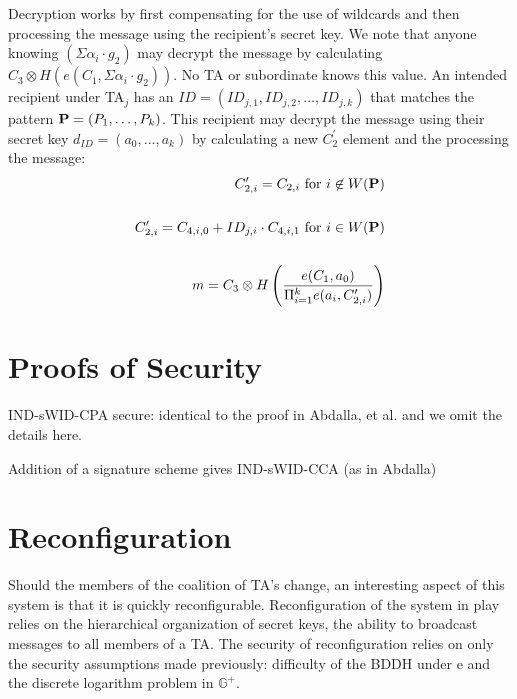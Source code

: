 \documentclass[10pt]{article}
\begin{document}
Decryption works by first compensating for the use of wildcards and then processing the message using the recipient's secret key. We note that anyone knowing $(\Sigma \alpha_i \cdot g_2)$ may decrypt the message by calculating $C_3 \otimes H (e(C_1, \Sigma \alpha_i \cdot g_2))$. No TA or subordinate knows this value. An intended recipient under TA$_j$ has an $ID = (ID_{j,1}, ID_{j,2}, \dots, ID_{j,k})$ that matches the pattern ${\bf P} = (P_1,
\dots, P_k)$. This recipient may decrypt the message using their secret key $d_{ID} = (a_0, \dots, a_k)$ by calculating a new $C_2^{\prime}$
element and the processing the message:
\begin{align*}
C_{2,i}^{\prime} = C_{2,i}\text{ for }i \not\in W({\bf P})\\
\\
C_{2,i}^{\prime} = C_{4,i,0} + ID_{j,i} \cdot C_{4,i,1}\text{ for }i \in W({\bf P})\\
\\
m = C_3 \otimes H\left(\frac{e(C_1, a_0)}{\Pi_{i=1}^k e(a_i, C_{2,i}^{\prime})}\right)
\end{align*}
\section*{Proofs of Security}
IND-sWID-CPA secure:  identical to the proof in Abdalla, et al. and we omit the details here.

Addition of a signature scheme gives IND-sWID-CCA (as in Abdalla)


\section*{Reconfiguration}

Should the members of the coalition of TA's change, an interesting aspect of this system is that it is quickly reconfigurable.  Reconfiguration of the system in play relies on the hierarchical organization of secret keys, the ability to broadcast messages to all members of a TA.  The security of reconfiguration relies on only the security assumptions made previously: difficulty of the BDDH under e and the discrete logarithm problem in $\mathbb{G}^+$.
 
\end{document}
